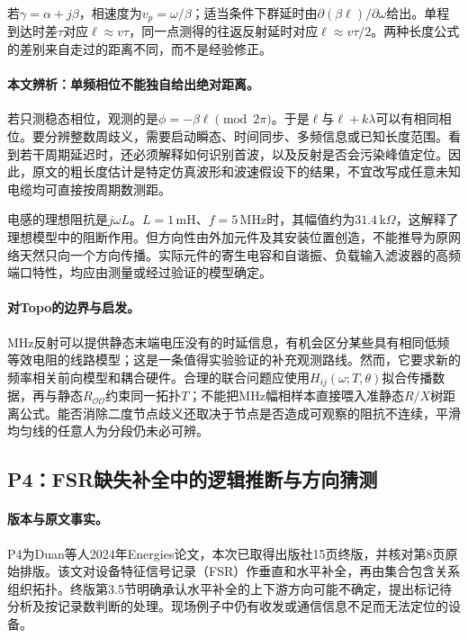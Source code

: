 \documentclass[UTF8,11pt,fontset=fandol]{ctexart}
\theoremstyle{remark}
\numberwithin{equation}{section}
\begin{document}
若$\gamma=\alpha+j\beta$，相速度为$v_p=\omega/\beta$；适当条件下群延时由$\partial(\beta\ell)/\partial\omega$给出。单程到达时差$\tau$对应$\ell\approx v\tau$，同一点测得的往返反射延时对应$\ell\approx v\tau/2$。两种长度公式的差别来自走过的距离不同，而不是经验修正。

\paragraph{本文辨析：单频相位不能独自给出绝对距离。}
若只测稳态相位，观测的是$\phi=-\beta\ell\pmod{2\pi}$。于是$\ell$与$\ell+k\lambda$可以有相同相位。要分辨整数周歧义，需要启动瞬态、时间同步、多频信息或已知长度范围。看到若干周期延迟时，还必须解释如何识别首波，以及反射是否会污染峰值定位。因此，原文的粗长度估计是特定仿真波形和波速假设下的结果，不宜改写成任意未知电缆均可直接按周期数测距。

电感的理想阻抗是$j\omega L$。$L=1$\,mH、$f=5$\,MHz时，其幅值约为$31.4$\,k$\Omega$，这解释了理想模型中的阻断作用。但方向性由外加元件及其安装位置创造，不能推导为原网络天然只向一个方向传播。实际元件的寄生电容和自谐振、负载输入滤波器的高频端口特性，均应由测量或经过验证的模型确定。

\paragraph{对Topo的边界与启发。}
MHz反射可以提供静态末端电压没有的时延信息，有机会区分某些具有相同低频等效电阻的线路模型；这是一条值得实验验证的补充观测路线。然而，它要求新的频率相关前向模型和耦合硬件。合理的联合问题应使用$H_{ij}(\omega;T,\theta)$拟合传播数据，再与静态$R_{\mathcal O\mathcal O}$约束同一拓扑$T$；不能把MHz幅相样本直接喂入准静态$R/X$树距离公式。能否消除二度节点歧义还取决于节点是否造成可观察的阻抗不连续，平滑均匀线的任意人为分段仍未必可辨。

\subsection{P4：FSR缺失补全中的逻辑推断与方向猜测}
\label{subsec:P4}

\paragraph{版本与原文事实。}
P4为Duan等人2024年Energies论文\citep{P4}，本次已取得出版社15页终版，并核对第8页原始排版。该文对设备特征信号记录（FSR）作垂直和水平补全，再由集合包含关系组织拓扑。终版第3.5节明确承认水平补全的上下游方向可能不确定，提出标记待分析及按记录数判断的处理。现场例子中仍有收发或通信信息不足而无法定位的设备。
\end{document}
